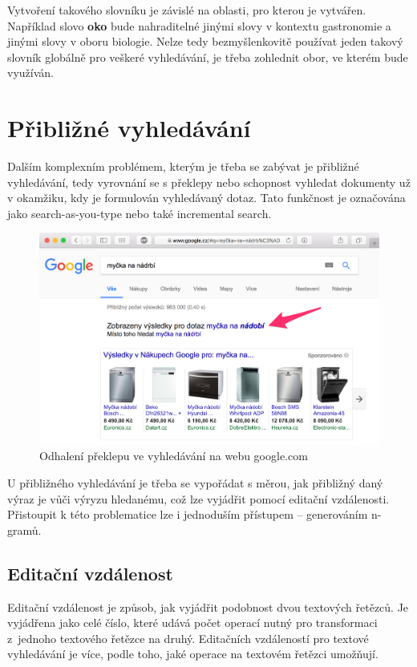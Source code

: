 \documentclass[FM,DP]{tulthesis}
\begin{document}
Vytvoření takového slovníku je závislé na oblasti, pro kterou je vytvářen. Například 
slovo \textbf{oko} bude nahraditelné jinými slovy v kontextu gastronomie a jinými 
slovy v oboru biologie. Nelze tedy bezmyšlenkovitě používat jeden takový slovník globálně 
pro veškeré vyhledávání, je třeba zohlednit obor, ve kterém bude využíván.

\section{Přibližné vyhledávání}

Dalším komplexním problémem, kterým je třeba se zabývat je přibližné vyhledávání, tedy
vyrovnání se s překlepy nebo schopnost vyhledat dokumenty už v okamžiku, kdy je formulován
vyhledávaný dotaz. Tato funkčnost je označována jako search-as-you-type nebo také
incremental search.

\begin{figure}[h]
\center
\includegraphics[width=\textwidth]{google-preklep.png}
\caption[Odhalení překlepu ve vyhledávání]{Odhalení překlepu ve vyhledávání na webu google.com}
\label{google-preklep}
\end{figure}

U přibližného vyhledávání je třeba se vypořádat s měrou, jak přibližný daný výraz
je vůči výryzu hledanému, což lze vyjádřit pomocí editační vzdálenosti. Přistoupit
k této problematice lze i jednoduším přístupem -- generováním n-gramů.

\subsection{Editační vzdálenost}

Editační vzdálenost je způsob, jak vyjádřit podobnost dvou textových řetězců. Je
vyjádřena jako celé číslo, které udává počet operací nutný pro transformaci z~jednoho
textového řetězce na druhý. Editačních vzdáleností pro textové vyhledávání je více, 
podle toho, jaké operace na textovém řetězci umožňují.
\end{document}
